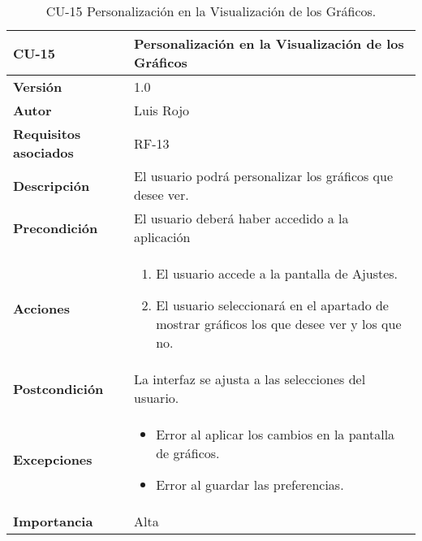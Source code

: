 \begin{table}[p]
	\centering
	\begin{tabularx}{\linewidth}{ p{} p{} }
		\toprule
		\textbf{CU-15}    & \textbf{Personalización en la Visualización de los Gráficos}\\
		\toprule
		\textbf{Versión}              & 1.0    \\
		\textbf{Autor}                & Luis Rojo \\
		\textbf{Requisitos asociados} & RF-13 \\
		\textbf{Descripción}          & El usuario podrá personalizar los gráficos que desee ver. \\
		\textbf{Precondición}         &  El usuario deberá haber accedido a la aplicación \\
		\textbf{Acciones}             &
		\begin{enumerate}
			\def\labelenumi{\arabic{enumi}.}
			\tightlist
			\item El usuario accede a la pantalla de Ajustes.
                \item El usuario seleccionará en el apartado de mostrar gráficos los que desee ver y los que no.
		\end{enumerate}\\
		\textbf{Postcondición}        & La interfaz se ajusta a las selecciones del usuario.  \\
		\textbf{Excepciones}          &  
            \begin{itemize}
                \item Error al aplicar los cambios en la pantalla de gráficos.
                \item Error al guardar las preferencias.
            \end{itemize}
           \\
		\textbf{Importancia}          & Alta  \\
		\bottomrule
	\end{tabularx}
	\caption{CU-15 Personalización en la Visualización de los Gráficos.}
\end{table}

